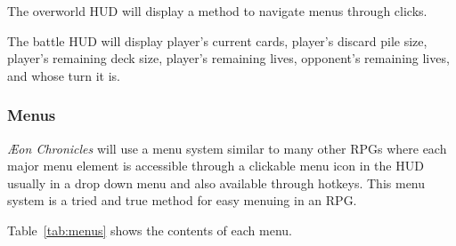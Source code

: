 \documentclass[12pt,titlepage]{article}
\newcommand\gametitle{\textit{\AE on Chronicles}\xspace}
\begin{document}
The overworld HUD will display a method to navigate menus through clicks.

The battle HUD will display player's current cards, player's discard pile size, 
player's remaining deck size, player's remaining lives, opponent's remaining 
lives, and whose turn it is.

\subsubsection{Menus}
\label{sec:menus}

\gametitle will use a menu system similar to many other RPGs where each major 
menu element is accessible through a clickable menu icon in the HUD usually in 
a drop down menu and also available through hotkeys. This menu system is a 
tried and true method for easy menuing in an RPG.

Table~\ref{tab:menus} shows the contents of each menu.
\end{document}
